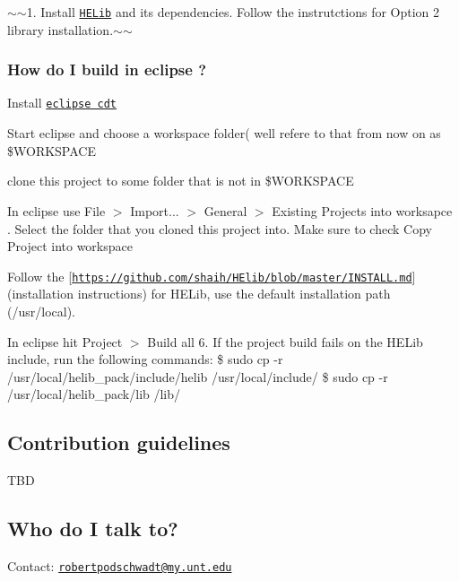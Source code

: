 $\sim$$\sim$1. Install \href{https://github.com/shaih/HElib}{\tt H\+E\+Lib} and its dependencies. Follow the instrutctions for Option 2 library installation.$\sim$$\sim$

\subsubsection*{How do I build in eclipse ?}


\begin{DoxyEnumerate}
\item Install \href{https://www.eclipse.org/cdt/}{\tt eclipse cdt}
\item Start eclipse and choose a workspace folder( we\textquotesingle{}ll refere to that from now on as {\ttfamily \$\+W\+O\+R\+K\+S\+P\+A\+CE}
\item {\ttfamily clone} this project to some folder that is not in {\ttfamily \$\+W\+O\+R\+K\+S\+P\+A\+CE}
\item In eclipse use File $>$ Import... $>$ General $>$ Existing Projects into worksapce . Select the folder that you cloned this project into. Make sure to check \textquotesingle{}Copy Project into workspace\textquotesingle{}
\item Follow the \mbox{[}\href{https://github.com/shaih/HElib/blob/master/INSTALL.md}{\tt https\+://github.\+com/shaih/\+H\+Elib/blob/master/\+I\+N\+S\+T\+A\+L\+L.\+md}\mbox{]}(installation instructions) for H\+E\+Lib, use the default installation path (/usr/local).
\item In eclipse hit Project $>$ Build all 6. If the project build fails on the H\+E\+Lib include, run the following commands\+: {\ttfamily \$ sudo cp -\/r /usr/local/helib\+\_\+pack/include/helib /usr/local/include/} {\ttfamily \$ sudo cp -\/r /usr/local/helib\+\_\+pack/lib /lib/}
\end{DoxyEnumerate}

\subsection*{Contribution guidelines}

T\+BD

\subsection*{Who do I talk to?}

Contact\+: \href{mailto:robertpodschwadt@my.unt.edu}{\tt robertpodschwadt@my.\+unt.\+edu} 